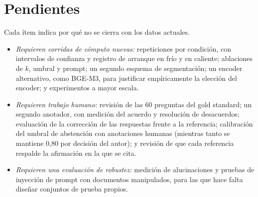 \documentclass[conference]{IEEEtran}
\begin{document}
\section{Pendientes}
Cada ítem indica por qué no se cierra con los datos actuales.
\begin{itemize}
  \item \textit{Requieren corridas de cómputo nuevas:} repeticiones por condición, con intervalos de confianza y registro de arranque en frío y en caliente; ablaciones de $k$, umbral y prompt; un segundo esquema de segmentación; un encoder alternativo, como BGE-M3, para justificar empíricamente la elección del encoder; y experimentos a mayor escala.
  \item \textit{Requieren trabajo humano:} revisión de las 60 preguntas del gold standard; un segundo anotador, con medición del acuerdo y resolución de desacuerdos; evaluación de la corrección de las respuestas frente a la referencia; calibración del umbral de abstención con anotaciones humanas (mientras tanto se mantiene 0,80 por decisión del autor); y revisión de que cada referencia respalde la afirmación en la que se cita.
  \item \textit{Requieren una evaluación de robustez:} medición de alucinaciones y pruebas de inyección de prompt con documentos manipulados, para las que hace falta diseñar conjuntos de prueba propios.
\end{itemize}
\end{document}
